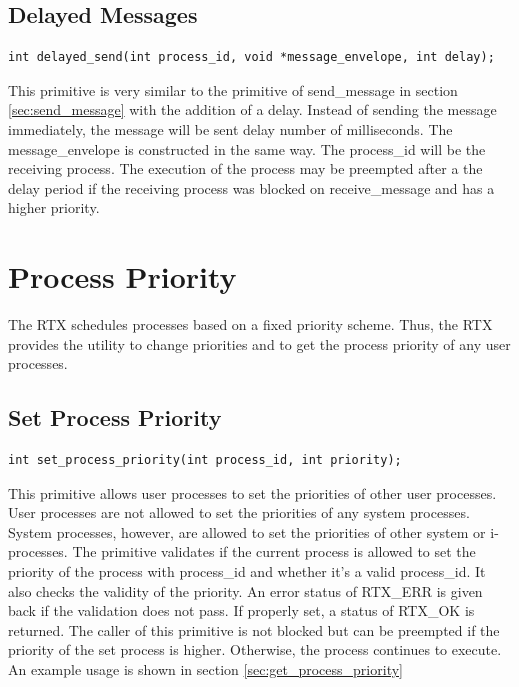 \documentclass[12pt,twocolumn]{report}
\begin{document}
\subsection{Delayed Messages}
\begin{lstlisting}
int delayed_send(int process_id, void *message_envelope, int delay);
\end{lstlisting}

\par This primitive is very similar to the primitive of send\_message in section \ref{sec:send_message} with the addition of a delay. Instead of sending the message immediately, the message will be sent delay number of milliseconds. The message\_envelope is constructed in the same way. The process\_id will be the receiving process. The execution of the process may be preempted after a the delay period if the receiving process was blocked on receive\_message and has a higher priority.

\section{Process Priority}
\par The RTX schedules processes based on a fixed priority scheme. Thus, the RTX provides the utility to change priorities and to get the process priority of any user processes.

\subsection{Set Process Priority}
\label{sec:set_process_priority}
\begin{lstlisting}
int set_process_priority(int process_id, int priority);
\end{lstlisting}

This primitive allows user processes to set the priorities of other user processes. User processes are not allowed to set the priorities of any system processes. System processes, however, are allowed to set the priorities of other system or i-processes. The primitive validates if the current process is allowed to set the priority of the process with process\_id and whether it's a valid process\_id. It also checks the validity of the priority. An error status of RTX\_ERR is given back if the validation does not pass. If properly set, a status of RTX\_OK is returned. The caller of this primitive is not blocked but can be preempted if the priority of the set process is higher. Otherwise, the process continues to execute. An example usage is shown in section \ref{sec:get_process_priority}
\end{document}

